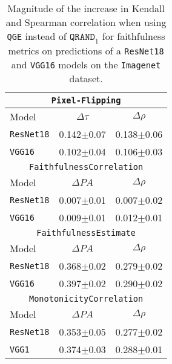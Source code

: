 \begin{table}[!t]
    \vskip 0.15in
    \begin{center}
    \begin{small}
    \begin{sc}
    \begin{tabular}{l|c|c}
        \multicolumn{3}{c}{\texttt{Pixel-Flipping}}\\
        \hline
        Model & $\Delta \tau$ & $\Delta \rho$\\
        \toprule
        \texttt{ResNet18} & 0.142$\pm$0.07 & 0.138$\pm$0.06\\
        \texttt{VGG16} & 0.102$\pm$0.04 & 0.106$\pm$0.03\\
        \hline
        \multicolumn{3}{c}{\texttt{FaithfulnessCorrelation}}\\
        \hline
        Model & $\Delta PA$ & $\Delta \rho$\\
        \toprule
        \texttt{ResNet18} & 0.007$\pm$0.01 & 0.007$\pm$0.02\\
        \texttt{VGG16} & 0.009$\pm$0.01 & 0.012$\pm$0.01\\
        \hline
        \multicolumn{3}{c}{\texttt{FaithfulnessEstimate}}\\
        \hline
        Model & $\Delta PA$ & $\Delta \rho$\\
        \toprule
        \texttt{ResNet18} & 0.368$\pm$0.02 & 0.279$\pm$0.02\\
        \texttt{VGG16} & 0.397$\pm$0.02 & 0.290$\pm$0.02\\
        \hline
        \multicolumn{3}{c}{\texttt{MonotonicityCorrelation}}\\
        \hline
        Model & $\Delta PA$ & $\Delta \rho$\\
        \toprule
        \texttt{ResNet18} & 0.353$\pm$0.05 & 0.277$\pm$0.02\\
        \texttt{VGG1} & 0.374$\pm$0.03 & 0.288$\pm$0.01\\
        \hline
    \end{tabular}
    \end{sc}
    \end{small}
    \end{center}
    \caption{Magnitude of the increase in Kendall and Spearman correlation when using \texttt{QGE} instead of $\texttt{QRAND}_1$ for faithfulness metrics on predictions of a \texttt{ResNet18} and \texttt{VGG16} models on the \texttt{Imagenet} dataset.}
    \label{tab:effects_faithfulness}
\end{table}

